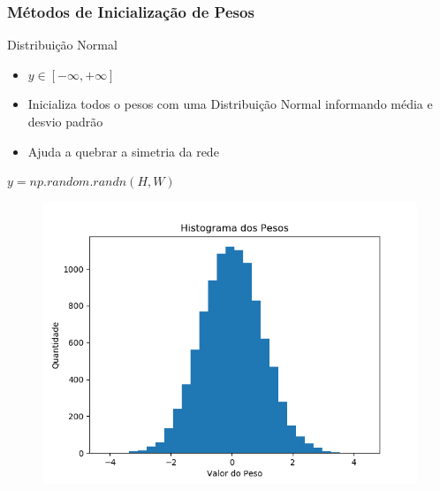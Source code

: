 \documentclass{beamer}
\begin{document}
\begin{frame}
	\frametitle{Métodos de Inicialização de Pesos}
	\begin{block}{Distribuição Normal}
		\begin{itemize}
			\item $y \in [-\infty, +\infty]$ 
			\item Inicializa todos o pesos com uma Distribuição Normal informando média e desvio padrão 
			\item Ajuda a quebrar a simetria da rede
		\end{itemize}
		$	y = np.random.randn(H, W)$
		\begin{figure}
			\centering
			\includegraphics[width=0.5\linewidth]{figures/pesos_normal.png}
		\end{figure}
	\end{block}
\end{frame}
\end{document}
